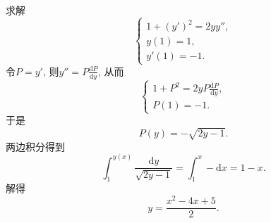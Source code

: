 \begin{example}
  求解
  \begin{equation}
    \begin{cases}
      1 + \left( y' \right)^{2} = 2y y'', \\
      y(1) = 1, \\
      y'(1) = -1.
    \end{cases}
  \end{equation}
  令$P = y'$, 则$y'' = P \frac{\mathrm{d} P}{\mathrm{d} y}$, 从而
  \begin{equation}
    \begin{cases}
      1 + P ^{2} = 2y P \frac{\mathrm{d} P}{\mathrm{d} y}, \\
      P(1) = -1.
    \end{cases}
  \end{equation}
  于是
  \begin{equation}
    P(y) = - \sqrt{2y-1}.
  \end{equation}
  两边积分得到
  \begin{equation}
    \int_{1}^{y(x)} \frac{\mathrm{d} y}{\sqrt{2y-1}} = \int _{1}^{x}  -\mathrm{d} x = 1- x.
  \end{equation}
  解得
  \begin{equation}
    y = \frac{x^{2} - 4x + 5}{2}.
  \end{equation}
\end{example}
